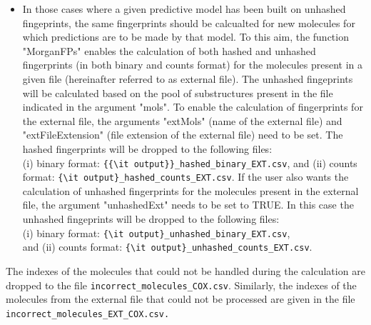 \documentclass[twoside,a4wide,12pt]{article}\usepackage[]{graphicx}\usepackage[]{color}
\begin{document}
\begin{itemize}
\item In those cases where a given predictive model has been built on unhashed fingeprints, the same fingerprints should be 
calcualted for new molecules for which predictions are to be made by that model. 
To this aim, the function "MorganFPs" enables the calculation of both hashed and unhashed fingerprints (in both binary and counts format) for the molecules present in a given file (hereinafter referred to as external file). The unhashed fingeprints will be calculated based on the pool of substructures present in the file indicated in the argument "mols".
To enable the calculation of fingerprints for the external file, the arguments "extMols" (name of the external file) and "extFileExtension" (file extension of the external file) need to be set. 
The hashed fingerprints will be dropped to the following files:\\
(i) binary format: \verb|{{\it output}}_hashed_binary_EXT.csv|, and (ii) counts format: 
\verb|{\it output}_hashed_counts_EXT.csv|.
If the user also wants the calculation of unhashed fingerprints for the molecules present in the external file, the argument "unhashedExt" needs to be set to TRUE. 
In this case the unhashed fingeprints will be dropped to the following files:\\
(i) binary format: \verb|{\it output}_unhashed_binary_EXT.csv|,\\
and (ii) counts format: \verb|{\it output}_unhashed_counts_EXT.csv|.

\end{itemize}

The indexes of the molecules that could not be handled during the calculation are dropped to the file \verb|incorrect_molecules_COX.csv|. Similarly, the indexes of the molecules from the external file that could not be processed are given in the file \verb|incorrect_molecules_EXT_COX.csv.|
\end{document}
